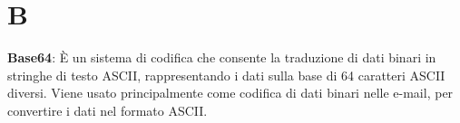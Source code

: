 \section*{B}
\textbf{Base64}: È un sistema di codifica che consente la traduzione di dati binari in stringhe di testo ASCII, rappresentando i dati sulla base di 64 caratteri ASCII diversi. Viene usato principalmente come codifica di dati binari nelle e-mail, per convertire i dati nel formato ASCII.